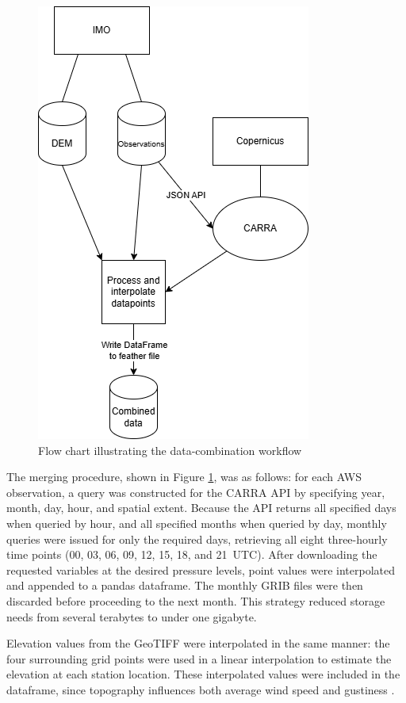 \begin{figure}[h]
  \centering
  \includegraphics[scale=0.5]{Figures/data_combination.drawio.png}
  \caption{Flow chart illustrating the data-combination workflow}
  \label{fig:data_preprocessing_flow_chart}
\end{figure}

The merging procedure, shown in Figure \ref{fig:data_preprocessing_flow_chart}, was as follows: for each AWS observation, a query was constructed for the CARRA API by specifying year, month, day, hour, and spatial extent. Because the API returns all specified days when queried by hour, and all specified months when queried by day, monthly queries were issued for only the required days, retrieving all eight three-hourly time points (00, 03, 06, 09, 12, 15, 18, and 21~UTC). After downloading the requested variables at the desired pressure levels, point values were interpolated and appended to a pandas dataframe. The monthly GRIB files were then discarded before proceeding to the next month. This strategy reduced storage needs from several terabytes to under one gigabyte.

Elevation values from the GeoTIFF were interpolated in the same manner: the four surrounding grid points were used in a linear interpolation to estimate the elevation at each station location. These interpolated values were included in the dataframe, since topography influences both average wind speed and gustiness \cite{GNP_vidtal}.

